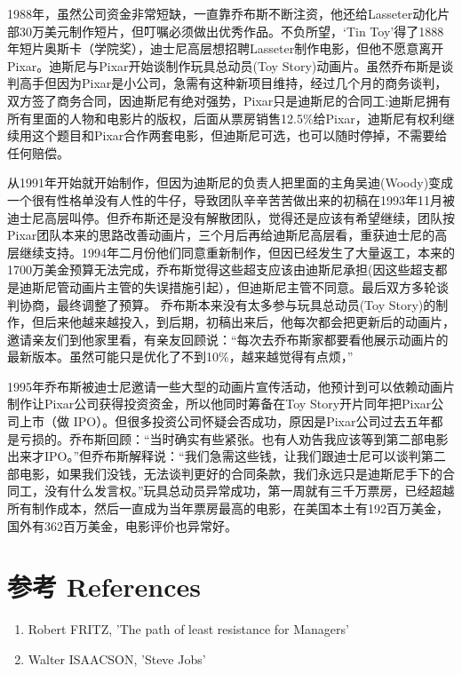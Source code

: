 1988年，虽然公司资金非常短缺，一直靠乔布斯不断注资，他还给Lasseter动化片部30万美元制作短片，但叮嘱必须做出优秀作品。不负所望，`Tin
Toy'得了1888
年短片奥斯卡（学院奖），迪士尼高层想招聘Lasseter制作电影，但他不愿意离开Pixar。迪斯尼与Pixar开始谈制作玩具总动员(Toy
Story)动画片。虽然乔布斯是谈判高手但因为Pixar是小公司，急需有这种新项目维持，经过几个月的商务谈判，双方签了商务合同，因迪斯尼有绝对强势，Pixar只是迪斯尼的合同工:迪斯尼拥有所有里面的人物和电影片的版权，后面从票房销售12.5\%给Pixar，迪斯尼有权利继续用这个题目和Pixar合作两套电影，但迪斯尼可选，也可以随时停掉，不需要给任何赔偿。

从1991年开始就开始制作，但因为迪斯尼的负责人把里面的主角吴迪(Woody)变成一个很有性格单没有人性的牛仔，导致团队辛辛苦苦做出来的初稿在1993年11月被迪士尼高层叫停。但乔布斯还是没有解散团队，觉得还是应该有希望继续，团队按Pixar团队本来的思路改善动画片，三个月后再给迪斯尼高层看，重获迪士尼的高层继续支持。1994年二月份他们同意重新制作，但因已经发生了大量返工，本来的1700万美金预算无法完成，乔布斯觉得这些超支应该由迪斯尼承担(因这些超支都是迪斯尼管动画片主管的失误措施引起），但迪斯尼主管不同意。最后双方多轮谈判协商，最终调整了预算。
乔布斯本来没有太多参与玩具总动员(Toy
Story)的制作，但后来他越来越投入，到后期，初稿出来后，他每次都会把更新后的动画片，邀请亲友们到他家里看，有亲友回顾说：``每次去乔布斯家都要看他展示动画片的最新版本。虽然可能只是优化了不到10\%，越来越觉得有点烦，''

1995年乔布斯被迪士尼邀请一些大型的动画片宣传活动，他预计到可以依赖动画片制作让Pixar公司获得投资资金，所以他同时筹备在Toy
Story开片同年把Pixar公司上市（做
IPO）。但很多投资公司怀疑会否成功，原因是Pixar公司过去五年都是亏损的。乔布斯回顾：``当时确实有些紧张。也有人劝告我应该等到第二部电影出来才IPO。''但乔布斯解释说：``我们急需这些钱，让我们跟迪士尼可以谈判第二部电影，如果我们没钱，无法谈判更好的合同条款，我们永远只是迪斯尼手下的合同工，没有什么发言权。''玩具总动员异常成功，第一周就有三千万票房，已经超越所有制作成本，然后一直成为当年票房最高的电影，在美国本土有192百万美金，国外有362百万美金，电影评价也异常好。

\hypertarget{ux53c2ux8003-references}{%
\section{参考 References}\label{ux53c2ux8003-references}}

\begin{enumerate}
\tightlist
\item
  Robert FRITZ, 'The path of least resistance for Managers'
\item
  Walter ISAACSON, 'Steve Jobs'
\end{enumerate}

\begin{description}
\item[]
\end{description}


